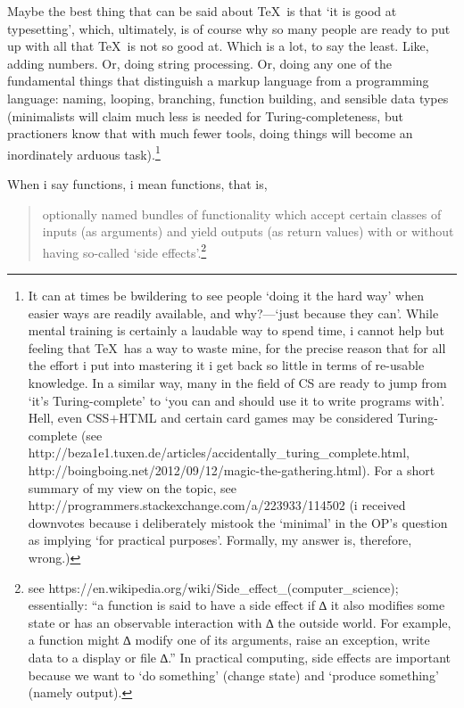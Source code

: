Maybe the best thing that can be said about \TeX\ is that `it is good at typesetting', which, ultimately, is
of course why so many people are ready to put up with all that \TeX\ is not so good at. Which is a lot, to
say the least. Like, adding numbers. Or, doing string processing. Or, doing any one of the fundamental things that
distinguish a markup language from a programming language: naming, looping, branching, function building,
and sensible data types (minimalists will claim much less is needed for Turing-completeness, but practioners
know that with much fewer tools, doing things will become an inordinately arduous task).\footnote{It can at
times be bwildering to see people `doing it the hard way' when easier ways are readily available, and
why?---`just because they can'. While mental training is certainly a laudable way to spend time, i cannot
help but feeling that \TeX\ has a way to waste mine, for the precise reason that for all the effort i put
into mastering it i get back so little in terms of re-usable knowledge. In a similar way, many in the field
of CS are ready to jump from `it's Turing-complete' to `you can and should use it to write programs with'.
Hell, even CSS$+$HTML and certain card games may be considered Turing-complete (see
http://beza1e1.tuxen.de/articles/accidentally\_turing\_complete.html,
http://boingboing.net/2012/09/12/magic-the-gathering.html). For a short summary of my view on the topic, see
http://programmers.stackexchange.com/a/223933/114502 (i received downvotes because i deliberately mistook
the `minimal' in the OP's question as implying `for practical purposes'. Formally, my answer is, therefore,
wrong.)}

When i say functions, i mean functions, that is,

\begin{quote}
optionally named bundles of functionality which accept
certain classes of inputs (as arguments) and yield outputs (as return values) with or without having
so-called `side effects'.\footnote{see https://en.wikipedia.org/wiki/Side\_effect\_(computer\_science);
essentially: ``a function is said to have a side effect if ∆ it also modifies some state or has an
observable interaction with ∆ the outside world. For example, a function might ∆ modify one of its
arguments, raise an exception, write data to a display or file ∆.'' In practical computing, side effects are
important because we want to `do something' (change state) and `produce something' (namely output).}
\end{quote}

